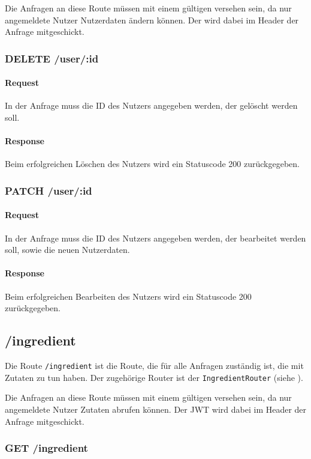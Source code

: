 \documentclass{entwurfsheft}
\begin{document}
Die Anfragen an diese Route müssen mit einem gültigen  versehen sein, da nur angemeldete Nutzer Nutzerdaten ändern können.
Der  wird dabei im Header der Anfrage mitgeschickt.

\subsubsection*{DELETE /user/:id}
\paragraph{Request}
In der Anfrage muss die ID des Nutzers angegeben werden, der gelöscht werden soll.
\paragraph{Response}
Beim erfolgreichen Löschen des Nutzers wird ein Statuscode 200 zurückgegeben.

\subsubsection*{PATCH /user/:id}
\paragraph{Request}
In der Anfrage muss die ID des Nutzers angegeben werden, der bearbeitet werden soll, sowie die neuen Nutzerdaten.
\paragraph{Response}
Beim erfolgreichen Bearbeiten des Nutzers wird ein Statuscode 200 zurückgegeben.

\subsection{/ingredient}
Die Route \texttt{/ingredient} ist die Route, die für alle Anfragen zuständig ist, die mit Zutaten zu tun haben.
Der zugehörige Router ist der \texttt{IngredientRouter} (siehe ).

Die Anfragen an diese Route müssen mit einem gültigen  versehen sein, da nur angemeldete Nutzer Zutaten abrufen können.
Der JWT wird dabei im Header der Anfrage mitgeschickt.


\subsubsection*{GET /ingredient}
\end{document}
